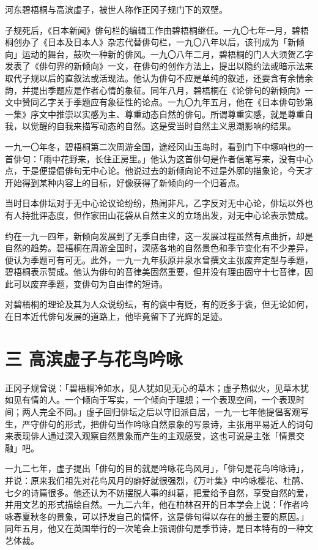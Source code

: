  {\FS
  河东碧梧桐与高滨虚子，被世人称作正冈子规门下的双壁。

  子规死后，《日本新闻》俳句栏的编辑工作由碧梧桐继任。一九〇七年一月，碧梧桐创办了《日本及日本人》杂志代替俳句栏，一九〇八年以后，该刊成为「新倾向」运动的舞台，鼓吹一种新的俳风。一九〇八年二月，碧梧桐的门人大须贺乙字发表了《俳句界的新倾向》一文，在俳句的创作方法上，提出以隐约法或暗示法来取代子规以后的直叙法或活现法。他认为俳句不应是单纯的叙述，还要含有余情余韵，并提出季题应是作者心情的象征。同年八月，碧梧桐在《论俳句的新倾向》一文中赞同乙字关于季题应有象征性的论点。一九〇九年五月，他在《日本俳句钞第一集》序文中推崇以实感为主、尊重动态自然的俳句。所谓尊重实感，就是尊重自我，以觉醒的自我来描写动态的自然。这是受当时自然主义思潮影响的结果。

  一九一〇年冬，碧梧桐第二次周游全国，途经冈山玉岛时，看到门下中塚响也的一首俳句：「雨中花野来，长住正房里。」他认为这首俳句是作者信笔写来，没有中心点，于是便提倡俳句无中心论。他说过去的新倾向论不过是外廓的描象论，今天才开始得到某种内容上的目标，好像获得了新倾向的一个归着点。

  当时日本俳坛对于无中心论议论纷纷，热闹非凡，乙字反对无中心论，俳坛以外也有人持批评态度，但作家田山花袋从自然主义的立场出发，对无中心论表示赞成。

  约在一九一四年，新倾向发展到了无季自由律，这一发展过程虽然有点曲折，却是自然的趋势。碧梧桐在周游全国时，深感各地的自然景色和季节变化有不少差异，便认为季题可有可无。此外，一九一九年荻原井泉水曾撰文主张废弃定型与季题，碧梧桐表示赞成。他认为俳句的音律美固然重要，但并没有理由固守十七音律，因此可以废弃季题，变俳句为自由律的短诗。

  对碧梧桐的理论及其为人众说纷纭，有的褒中有贬，有的贬多于褒，但无论如何，在日本近代俳句发展的道路上，他毕竟留下了光辉的足迹。
 }

\section*{\FS 三 高滨虚子与花鸟吟咏}

 {\FS
  正冈子规曾说：「碧梧桐冷如水，见人犹如见无心的草木；虚子热似火，见草木犹如见有情的人。一个倾向于写实，一个倾向于理想；一个表现空间，一个表现时间；两人完全不同。」虚子回归俳坛之后以守旧派自居，一九一七年他提倡客观写生，严守俳句的形式，把俳句当作吟咏自然景象的写景诗，主张用平易近人的词句来表现俳人通过深入观察自然景象而产生的主观感受，这也可说是主张「情景交融」吧。

  一九二七年，虚子提出「俳句的目的就是吟咏花鸟风月」，「俳句是花鸟吟咏诗」，并说：原来我们祖先对花鸟风月的癖好就很强烈，《万叶集》中吟咏樱花、杜鹃、七夕的诗篇很多。他还认为不妨摆脱人事的纠葛，把爱给予自然，享受自然的爱，并用文艺的形式描绘自然。一九二六年，他在柏林召开的日本学会上说：「作者吟咏春夏秋冬的景象，可以抒发自己的情怀，这是俳句得以存在的最主要的原因。」同年五月，他又在英国举行的一次笔会上强调俳句是季节诗，是日本特有的一种文艺体裁。
 }


